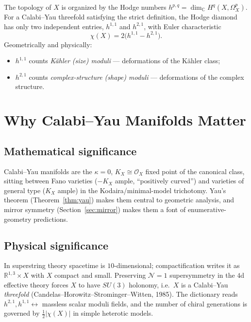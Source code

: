 \documentclass{amsart}
\begin{document}
The topology of $X$ is organized by the Hodge numbers
$h^{p,q} = \dim_{\mathbb{C}} H^q(X,\Omega_X^p)$. For a Calabi--Yau
threefold satisfying the strict definition, the Hodge diamond has only two
independent entries, $h^{1,1}$ and $h^{2,1}$, with Euler characteristic
\begin{equation}
  \chi(X) = 2\bigl(h^{1,1} - h^{2,1}\bigr).
\end{equation}
Geometrically and physically:
\begin{itemize}
  \item $h^{1,1}$ counts \emph{K\"ahler (size) moduli} --- deformations of
        the K\"ahler class;
  \item $h^{2,1}$ counts \emph{complex-structure (shape) moduli} ---
        deformations of the complex structure.
\end{itemize}

\section{Why Calabi--Yau Manifolds Matter}

\subsection{Mathematical significance}
Calabi--Yau manifolds are the $\kappa = 0$, $K_X \cong \mathcal{O}_X$
fixed point of the canonical class, sitting between Fano varieties
($-K_X$ ample, ``positively curved'') and varieties of general type
($K_X$ ample) in the Kodaira/minimal-model trichotomy. Yau's theorem
(Theorem~\ref{thm:yau}) makes them central to geometric analysis, and
mirror symmetry (Section~\ref{sec:mirror}) makes them a font of
enumerative-geometry predictions.

\subsection{Physical significance}
In superstring theory spacetime is $10$-dimensional; compactification
writes it as $\mathbb{R}^{1,3} \times X$ with $X$ compact and small.
Preserving $\mathcal{N}=1$ supersymmetry in the $4$d effective theory
forces $X$ to have $SU(3)$ holonomy, i.e.\ $X$ is a Calabi--Yau
\emph{threefold} (Candelas--Horowitz--Strominger--Witten, 1985). The
dictionary reads $h^{2,1}, h^{1,1} \leftrightarrow$ massless scalar moduli
fields, and the number of chiral generations is governed by
$\tfrac{1}{2}|\chi(X)|$ in simple heterotic models.
\end{document}
